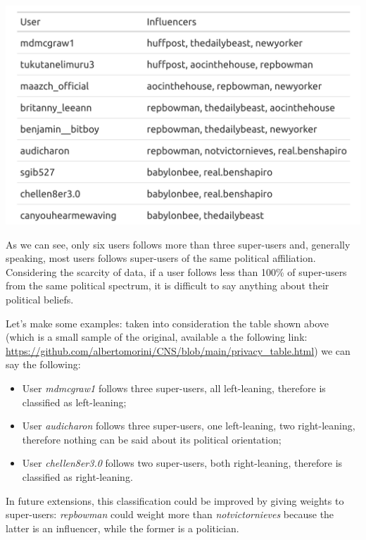 \aCapo{}
\includegraphics[width = .5\textwidth]{images/final_privacy_table.png}

As we can see, only six users follows more than three super-users and, generally speaking, most users follows super-users of the same political affiliation. Considering the scarcity of data, if a user follows less than 100\% of super-users from the same political spectrum, it is difficult to say anything about their political beliefs.

Let's make some examples: taken into consideration the table shown above (which is a small sample of the original, available a the following link: \url{https://github.com/albertomorini/CNS/blob/main/privacy_table.html}) we can say the following:

\begin{itemize}
    \item User \textit{mdmcgraw1} follows three super-users, all left-leaning, therefore is classified as left-leaning;
    \item User \textit{audicharon} follows three super-users, one left-leaning, two right-leaning, therefore nothing can be said about its political orientation;
    \item User \textit{chellen8er3.0} follows two super-users, both right-leaning, therefore is classified as right-leaning.
\end{itemize}

In future extensions, this classification could be improved by giving weights to super-users: \textit{repbowman} could weight more than \textit{notvictornieves} because the latter is an influencer, while the former is a politician.